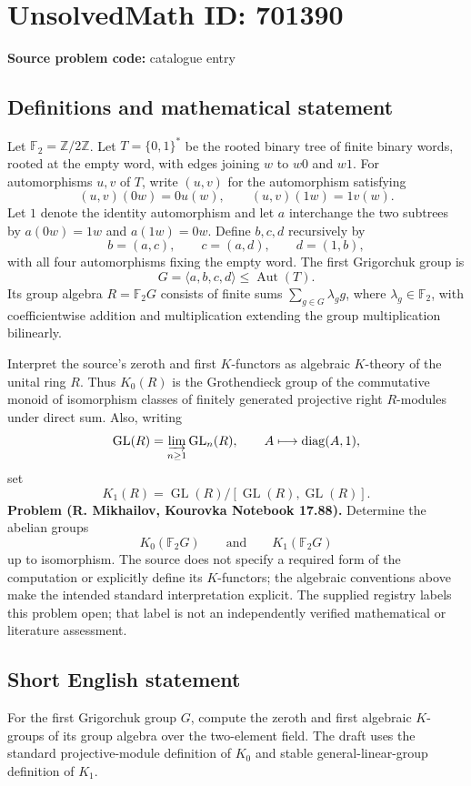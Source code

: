 \documentclass[11pt]{article}
\newcommand{\Z}{\mathbb{Z}}
\newcommand{\F}{\mathbb{F}}
\begin{document}
\section*{UnsolvedMath ID: 701390}
\textbf{Source problem code:} catalogue entry
\subsection{Definitions and mathematical statement}
Let \(\F_2=\Z/2\Z\). Let \(T=\{0,1\}^{*}\) be the rooted binary tree of finite binary words, rooted at the empty word, with edges joining \(w\) to \(w0\) and \(w1\). For automorphisms \(u,v\) of \(T\), write \((u,v)\) for the automorphism satisfying
\[
(u,v)(0w)=0u(w),\qquad (u,v)(1w)=1v(w).
\]
Let \(1\) denote the identity automorphism and let \(a\) interchange the two subtrees by \(a(0w)=1w\) and \(a(1w)=0w\). Define \(b,c,d\) recursively by
\[
b=(a,c),\qquad c=(a,d),\qquad d=(1,b),
\]
with all four automorphisms fixing the empty word. The first Grigorchuk group is
\[
G=\langle a,b,c,d\rangle\leq\operatorname{Aut}(T).
\]
Its group algebra \(R=\F_2G\) consists of finite sums \(\sum_{g\in G}\lambda_g g\), where \(\lambda_g\in\F_2\), with coefficientwise addition and multiplication extending the group multiplication bilinearly.

Interpret the source's zeroth and first \(K\)-functors as algebraic \(K\)-theory of the unital ring \(R\). Thus \(K_0(R)\) is the Grothendieck group of the commutative monoid of isomorphism classes of finitely generated projective right \(R\)-modules under direct sum. Also, writing
\[
\operatorname{GL}(R)=\varinjlim_{n\geq1}\operatorname{GL}_n(R),
\qquad A\longmapsto\operatorname{diag}(A,1),
\]
set
\[
K_1(R)=\operatorname{GL}(R)/[\operatorname{GL}(R),\operatorname{GL}(R)].
\]
\textbf{Problem (R. Mikhailov, Kourovka Notebook 17.88).} Determine the abelian groups
\[
K_0(\F_2G)\qquad\text{and}\qquad K_1(\F_2G)
\]
up to isomorphism. The source does not specify a required form of the computation or explicitly define its \(K\)-functors; the algebraic conventions above make the intended standard interpretation explicit. The supplied registry labels this problem open; that label is not an independently verified mathematical or literature assessment.
\subsection{Short English statement}
For the first Grigorchuk group \(G\), compute the zeroth and first algebraic \(K\)-groups of its group algebra over the two-element field. The draft uses the standard projective-module definition of \(K_0\) and stable general-linear-group definition of \(K_1\).
\end{document}

